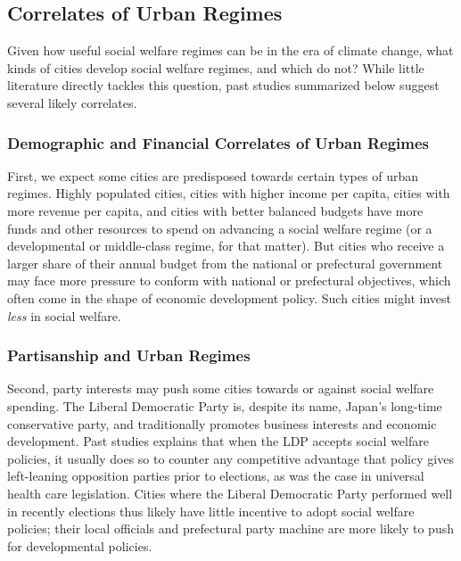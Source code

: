 \documentclass[preprint, 3p,
authoryear]{elsarticle} %
\begin{document}
\hypertarget{correlates-of-urban-regimes}{%
\subsection{Correlates of Urban
Regimes}\label{correlates-of-urban-regimes}}

Given how useful social welfare regimes can be in the era of climate
change, what kinds of cities develop social welfare regimes, and which
do not? While little literature directly tackles this question, past
studies summarized below suggest several likely correlates.

\hypertarget{demographic-and-financial-correlates-of-urban-regimes}{%
\subsubsection{Demographic and Financial Correlates of Urban
Regimes}\label{demographic-and-financial-correlates-of-urban-regimes}}

First, we expect some cities are predisposed towards certain types of
urban regimes. Highly populated cities, cities with higher income per
capita, cities with more revenue per capita, and cities with better
balanced budgets have more funds and other resources to spend on
advancing a social welfare regime (or a developmental or middle-class
regime, for that matter). But cities who receive a larger share of their
annual budget from the national or prefectural government may face more
pressure to conform with national or prefectural objectives, which often
come in the shape of economic development policy. Such cities might
invest \emph{less} in social welfare.

\hypertarget{partisanship-and-urban-regimes}{%
\subsubsection{Partisanship and Urban
Regimes}\label{partisanship-and-urban-regimes}}

Second, party interests may push some cities towards or against social
welfare spending. The Liberal Democratic Party is, despite its name,
Japan's long-time conservative party, and traditionally promotes
business interests and economic development. Past studies explains that
when the LDP accepts social welfare policies, it usually does so to
counter any competitive advantage that policy gives left-leaning
opposition parties prior to elections, as was the case in universal
health care legislation. Cities where the Liberal Democratic Party
performed well in recently elections thus likely have little incentive
to adopt social welfare policies; their local officials and prefectural
party machine are more likely to push for developmental policies.
\end{document}
